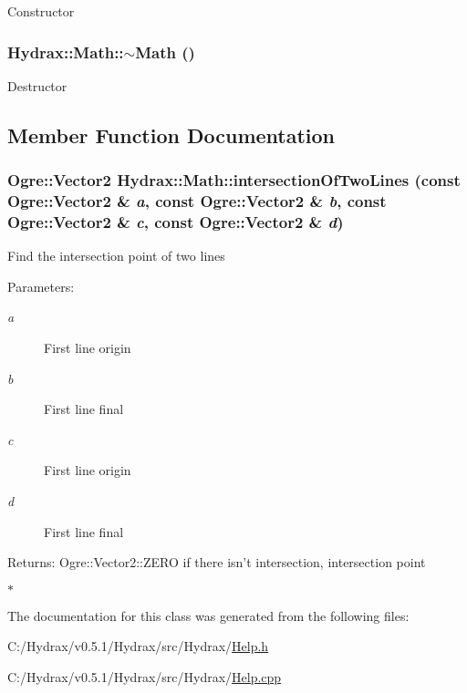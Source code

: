 Constructor \hypertarget{class_hydrax_1_1_math_dcecdafeffde184a040a4b786ce8f3f6}{
\subsubsection[{$\sim$Math}]{\setlength{\rightskip}{0pt plus 5cm}Hydrax::Math::$\sim$Math ()}}
\label{class_hydrax_1_1_math_dcecdafeffde184a040a4b786ce8f3f6}


Destructor 

\subsection{Member Function Documentation}
\hypertarget{class_hydrax_1_1_math_cf5291c3f843e57405cd575b6149e8b1}{
\subsubsection[{intersectionOfTwoLines}]{\setlength{\rightskip}{0pt plus 5cm}Ogre::Vector2 Hydrax::Math::intersectionOfTwoLines (const Ogre::Vector2 \& {\em a}, \/  const Ogre::Vector2 \& {\em b}, \/  const Ogre::Vector2 \& {\em c}, \/  const Ogre::Vector2 \& {\em d})}}
\label{class_hydrax_1_1_math_cf5291c3f843e57405cd575b6149e8b1}


Find the intersection point of two lines \begin{Desc}
\item[Parameters:]
\begin{description}
\item[{\em a}]First line origin \item[{\em b}]First line final \item[{\em c}]First line origin \item[{\em d}]First line final \end{description}
\end{Desc}
\begin{Desc}
\item[Returns:]Ogre::Vector2::ZERO if there isn't intersection, intersection point \end{Desc}


$\ast$ 

The documentation for this class was generated from the following files:\begin{CompactItemize}
\item 
C:/Hydrax/v0.5.1/Hydrax/src/Hydrax/\hyperlink{_help_8h}{Help.h}\item 
C:/Hydrax/v0.5.1/Hydrax/src/Hydrax/\hyperlink{_help_8cpp}{Help.cpp}\end{CompactItemize}
